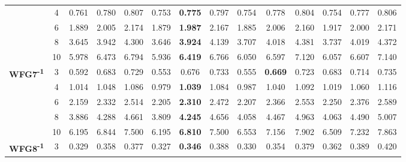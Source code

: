 \documentclass[onecolumn,10pt]{asme2ej}
\begin{document}
\begin{table}[!htb]
\begin{tabular}{|c|c|c|c|c|c|c|c|c|c|c|c|c|c|}
		& 4          & 0.761         & 0.780          & 0.807          & 0.753         & \textbf{0.775}  & 0.797          & 0.754         & 0.778          & 0.804          & 0.754         & 0.777          & 0.806          \\ \cline{2-14} 
		& 6          & 1.889         & 2.005          & 2.174          & 1.879         & \textbf{1.987}  & 2.167          & 1.885         & 2.006          & 2.160          & 1.917         & 2.000          & 2.171          \\ \cline{2-14} 
		& 8          & 3.645         & 3.942          & 4.300          & 3.646         & \textbf{3.924}  & 4.139          & 3.707         & 4.018          & 4.381          & 3.737         & 4.019          & 4.372          \\ \cline{2-14} 
		& 10         & 5.978         & 6.473          & 6.794          & 5.936         & \textbf{6.419}  & 6.766          & 6.050         & 6.597          & 7.120          & 6.057         & 6.607          & 7.140          \\ \hline
		\multirow{5}{*}{\textbf{WFG7\textsuperscript{-1}}} & 3          & 0.592         & 0.683          & 0.729          & 0.553         & 0.676           & 0.733          & 0.555         & \textbf{0.669} & 0.723          & 0.683         & 0.714          & 0.735          \\ \cline{2-14} 
		& 4          & 1.014         & 1.048          & 1.086          & 0.979         & \textbf{1.039}  & 1.084          & 0.987         & 1.040          & 1.092          & 1.019         & 1.060          & 1.116          \\ \cline{2-14} 
		& 6          & 2.159         & 2.332          & 2.514          & 2.205         & \textbf{2.310}  & 2.472          & 2.207         & 2.366          & 2.553          & 2.250         & 2.376          & 2.589          \\ \cline{2-14} 
		& 8          & 3.886         & 4.288          & 4.661          & 3.809         & \textbf{4.245}  & 4.656          & 4.058         & 4.467          & 4.963          & 4.063         & 4.490          & 5.007          \\ \cline{2-14} 
		& 10         & 6.195         & 6.844          & 7.500          & 6.195         & \textbf{6.810}  & 7.500          & 6.553         & 7.156          & 7.902          & 6.509         & 7.232          & 7.863          \\ \hline
		\multirow{5}{*}{\textbf{WFG8\textsuperscript{-1}}} & 3          & 0.329         & 0.358          & 0.377          & 0.327         & \textbf{0.346}  & 0.388          & 0.330         & 0.354          & 0.379          & 0.362         & 0.389          & 0.420          \\ \cline{2-14} 

\end{tabular}
\end{table}
\end{document}
